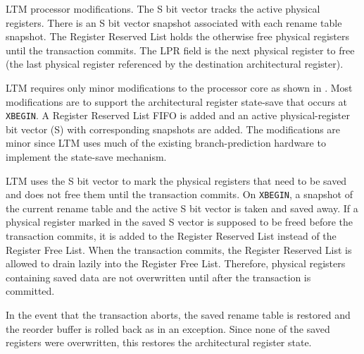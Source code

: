 
%
{LTM processor modifications. The S bit vector tracks the active
 physical registers. There is an S bit vector snapshot associated with
 each rename table snapshot. The Register Reserved List holds the
 otherwise free physical registers until the transaction commits. The
 LPR field is the next physical register to free (the last physical
 register referenced by the destination architectural register).}
 

LTM requires only minor modifications to the processor core as shown
in . Most modifications are to support the
architectural register state-save that occurs at \texttt{XBEGIN}. A
Register Reserved List FIFO is added and an active physical-register
bit vector (S) with corresponding snapshots are added. The
modifications are minor since LTM uses much of the existing
branch-prediction hardware to implement the state-save mechanism.

LTM uses the S bit vector to mark the physical registers that need to
be saved and does not free them until the transaction commits. On
\texttt{XBEGIN}, a snapshot of the current rename table and the active
S bit vector is taken and saved away. If a physical register marked in
the saved S vector is supposed to be freed before the transaction
commits, it is added to the Register Reserved List instead of the
Register Free List. When the transaction commits, the Register
Reserved List is allowed to drain lazily into the Register Free
List. Therefore, physical registers containing saved data are not
overwritten until after the transaction is committed.

In the event that the transaction aborts, the saved rename table is
restored and the reorder buffer is rolled back as in an exception.
Since none of the saved registers were overwritten, this restores the
architectural register state.

